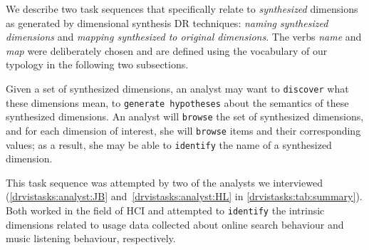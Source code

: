 
We describe two task sequences that specifically relate to {\it synthesized} dimensions as generated by dimensional synthesis \ac{DR} techniques: {\it naming synthesized dimensions} and {\it mapping synthesized to original dimensions}.
The verbs {\it name} and {\it map} were deliberately chosen and are defined using the vocabulary of our typology in the following two subsections.





Given a set of synthesized dimensions, an analyst may want to {\tt discover} what these dimensions mean, to {\tt generate hypotheses} about the semantics of these synthesized dimensions.
An analyst will {\tt browse} the set of synthesized dimensions, and for each dimension of interest, she will {\tt browse} items and their corresponding values; as a result, she may be able to {\tt identify} the name of a synthesized dimension.

This task sequence was attempted by two of the analysts we interviewed (\ref{drvistasks:analyst:JB} and~\ref{drvistasks:analyst:HL} in \autoref{drvistasks:tab:summary}). 
Both worked in the field of \ac{HCI} and attempted to {\tt identify} the intrinsic dimensions related to usage data collected about online search behaviour and music listening behaviour, respectively. 

